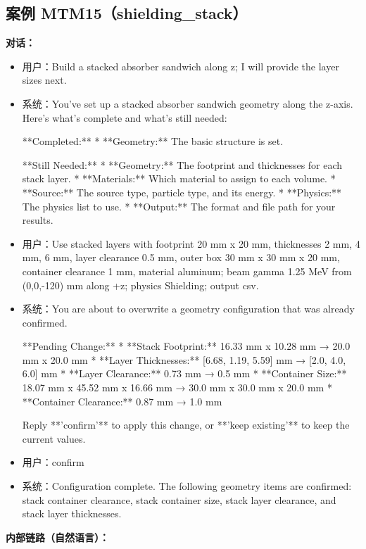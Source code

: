 \documentclass[11pt]{ctexart}
\begin{document}
\subsection{案例 MTM15（shielding\_stack）}
\textbf{对话：}
\begin{itemize}
\item 用户：Build a stacked absorber sandwich along z; I will provide the layer sizes next.
\item 系统：You've set up a stacked absorber sandwich geometry along the z-axis. Here's what's complete and what's still needed:

**Completed:**
*   **Geometry:** The basic structure is set.

**Still Needed:**
*   **Geometry:** The footprint and thicknesses for each stack layer.
*   **Materials:** Which material to assign to each volume.
*   **Source:** The source type, particle type, and its energy.
*   **Physics:** The physics list to use.
*   **Output:** The format and file path for your results.
\item 用户：Use stacked layers with footprint 20 mm x 20 mm, thicknesses 2 mm, 4 mm, 6 mm, layer clearance 0.5 mm, outer box 30 mm x 30 mm x 20 mm, container clearance 1 mm, material aluminum; beam gamma 1.25 MeV from (0,0,-120) mm along +z; physics Shielding; output csv.
\item 系统：You are about to overwrite a geometry configuration that was already confirmed.

**Pending Change:**
*   **Stack Footprint:** 16.33 mm x 10.28 mm → 20.0 mm x 20.0 mm
*   **Layer Thicknesses:** [6.68, 1.19, 5.59] mm → [2.0, 4.0, 6.0] mm
*   **Layer Clearance:** 0.73 mm → 0.5 mm
*   **Container Size:** 18.07 mm x 45.52 mm x 16.66 mm → 30.0 mm x 30.0 mm x 20.0 mm
*   **Container Clearance:** 0.87 mm → 1.0 mm

Reply **'confirm'** to apply this change, or **'keep existing'** to keep the current values.
\item 用户：confirm
\item 系统：Configuration complete. The following geometry items are confirmed: stack container clearance, stack container size, stack layer clearance, and stack layer thicknesses.
\end{itemize}
\textbf{内部链路（自然语言）：}
\end{document}
